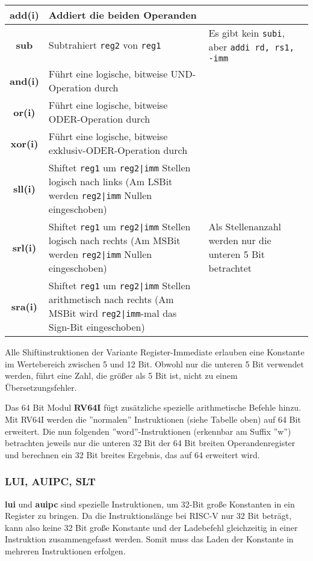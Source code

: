 {\begin{tabular}{|c|p{8cm}|p{4cm}|}
	\hline
	\textbf{add(i)} & Addiert die beiden Operanden & \\
	\hline
	\textbf{sub} & Subtrahiert \texttt{reg2} von \texttt{reg1}& Es gibt kein \texttt{subi}, aber \texttt{addi rd, rs1, -imm} \\
	\hline
	\textbf{and(i)} & Führt eine logische, bitweise UND-Operation durch & \\
	\hline
	\textbf{or(i)} & Führt eine logische, bitweise ODER-Operation durch & \\
	\hline
	\textbf{xor(i)} & Führt eine logische, bitweise exklusiv-ODER-Operation durch & \\
	\hline
	\textbf{sll(i)} & Shiftet \texttt{reg1} um \texttt{reg2|imm} Stellen logisch nach links (Am LSBit werden \texttt{reg2|imm} Nullen eingeschoben) & \multirow{3}{4cm}{Als Stellenanzahl werden nur die unteren 5 Bit betrachtet} \\
	\cline{1-2}
	\textbf{srl(i)} & Shiftet \texttt{reg1} um \texttt{reg2|imm} Stellen logisch nach rechts (Am MSBit werden \texttt{reg2|imm} Nullen eingeschoben) & \\
	\cline{1-2}
	\textbf{sra(i)} & Shiftet \texttt{reg1} um \texttt{reg2|imm} Stellen arithmetisch nach rechts (Am MSBit wird \texttt{reg2|imm}-mal das Sign-Bit eingeschoben) & \\
	\hline
\end{tabular}

\begin{warningblock}
	Alle Shiftinstruktionen der Variante Register-Immediate erlauben eine Konstante im Wertebereich zwischen 5 und 12 Bit. Obwohl nur die unteren 5 Bit verwendet werden, führt eine Zahl, die größer als 5 Bit ist, nicht zu einem Übersetzungsfehler.
\end{warningblock}
Das 64 Bit Modul \textbf{RV64I} fügt zusätzliche spezielle arithmetische Befehle hinzu. Mit RV64I werden die ''normalen'' Instruktionen (siehe Tabelle oben) auf 64 Bit erweitert. Die nun folgenden ''word''-Instruktionen (erkennbar am Suffix ''w'') betrachten jeweils nur die unteren 32 Bit der 64 Bit breiten Operandenregister und berechnen ein 32 Bit breites Ergebnis, das auf 64 erweitert wird.

\subsubsection{LUI, AUIPC, SLT}
\textbf{lui} und \textbf{auipc} sind spezielle Instruktionen, um 32-Bit große Konstanten in ein Register zu bringen. Da die Instruktionslänge bei RISC-V nur 32 Bit beträgt, kann also keine 32 Bit große Konstante und der Ladebefehl gleichzeitig in einer Instruktion zusammengefasst werden. Somit muss das Laden der Konstante in mehreren Instruktionen erfolgen.\\

}

